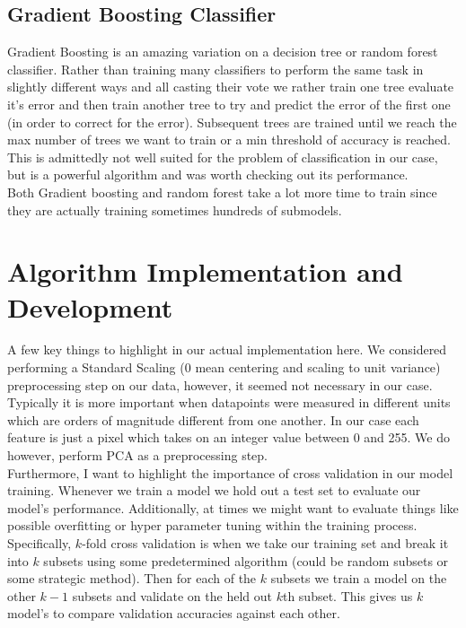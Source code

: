 \documentclass[11pt]{amsart}
\begin{document}
\subsection{Gradient Boosting Classifier}
Gradient Boosting is an amazing variation on a decision tree or random forest classifier.
Rather than training many classifiers to perform the same task in slightly different ways and all casting their vote we rather train one tree evaluate it's error and then train another tree to try and predict the error of the first one (in order to correct for the error).
Subsequent trees are trained until we reach the max number of trees we want to train or a min threshold of accuracy is reached.
This is admittedly not well suited for the problem of classification in our case, but is a powerful algorithm and was worth checking out its performance. \\

Both Gradient boosting and random forest take a lot more time to train since they are actually training sometimes hundreds of submodels. \\

\section{Algorithm Implementation and Development}\label{sec:algorithms}
A few key things to highlight in our actual implementation here. We considered performing a Standard Scaling (0 mean centering and scaling to unit variance) preprocessing step on our data, however, it seemed not necessary in our case.
Typically it is more important when datapoints were measured in different units which are orders of magnitude different from one another.
In our case each feature is just a pixel which takes on an integer value between 0 and 255.
We do however, perform PCA as a preprocessing step. \\

Furthermore, I want to highlight the importance of cross validation in our model training.
Whenever we train a model we hold out a test set to evaluate our model's performance.
Additionally, at times we might want to evaluate things like possible overfitting or hyper parameter tuning within the training process.
Specifically, $k$-fold cross validation is when we take our training set and break it into $k$ subsets using some predetermined algorithm (could be random subsets or some strategic method).
Then for each of the $k$ subsets we train a model on the other $k-1$ subsets and validate on the held out $k$th subset.
This gives us $k$ model's to compare validation accuracies against each other.
\end{document}
